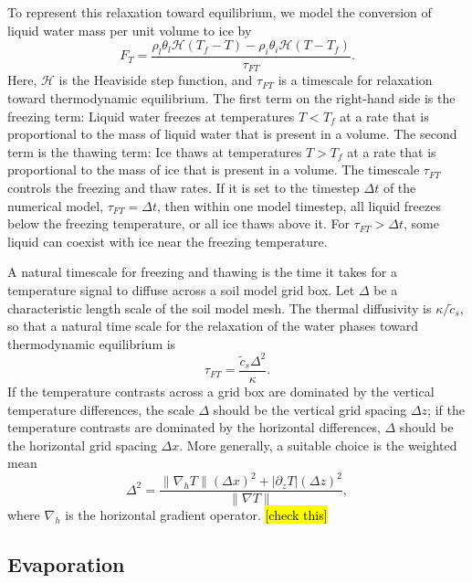 \documentclass{report}
\begin{document}
To represent this relaxation toward equilibrium, we model the conversion of liquid water mass per unit volume to ice by
\begin{equation}\label{e:freeze_thaw}
    F_T = \frac{\rho_l\theta_l \mathcal{H}(T_f - T) - \rho_i\theta_i \mathcal{H}(T - T_f)}{\tau_{FT}}.
\end{equation}
Here, $\mathcal{H}$ is the Heaviside step function, and $\tau_{FT}$ is a timescale for relaxation toward thermodynamic equilibrium. The first term on the right-hand side is the freezing term: Liquid water freezes at temperatures $T<T_f$ at a rate that is proportional to the mass of liquid water that is present in a volume. The second term is the thawing term: Ice thaws at temperatures $T>T_f$ at a rate that is proportional to the mass of ice that is present in a volume. The timescale $\tau_{FT}$ controls the freezing and thaw rates. If it is set to the timestep $\Delta t$ of the numerical model, $\tau_{FT} = \Delta t$, then within one model timestep, all liquid freezes below the freezing temperature, or all ice thaws above it. For $\tau_{FT} > \Delta t$, some liquid can coexist with ice near the freezing temperature.

A natural timescale for freezing and thawing is the time it takes for a temperature signal to diffuse across a soil model grid box. Let $\Delta$ be a characteristic length scale of the soil model mesh. The thermal diffusivity is $\kappa/\tilde c_s$, so that a natural time scale for the relaxation of the water phases toward thermodynamic equilibrium is 
\begin{equation}
    \tau_{FT} = \frac{\tilde{c}_s \Delta^2}{\kappa}.
\end{equation}
If the temperature contrasts across a grid box are dominated by the vertical temperature differences, the scale $\Delta$ should be the vertical grid spacing $\Delta z$; if the temperature contrasts are dominated by the horizontal differences, $\Delta$ should be the horizontal grid spacing $\Delta x$. More generally, a suitable choice is the weighted mean
\begin{equation}
    \Delta^2 = \frac{\| \nabla_h T \| (\Delta x)^2 + |\partial_z T| (\Delta z)^2}{\|\nabla T \|},
\end{equation}
where $\nabla_h$ is the horizontal gradient operator. \hl{[check this]}

\subsection{Evaporation}
\end{document}
